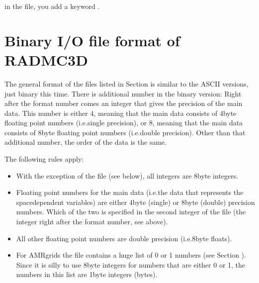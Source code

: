 \documentclass[letterpaper,10pt,english]{sphinxmanual}
\begin{document}
\begin{sphinxVerbatim}[commandchars=\\\{\}]
  
\end{sphinxVerbatim}

in the  file,  you add a keyword .


\section{Binary I/O file format of RADMC\sphinxhyphen{}3D}
\label{\detokenize{binaryio:binary-i-o-file-format-of-radmc-3d}}\label{\detokenize{binaryio:sec-binary-io}}
The general format of the files listed in Section
{\hyperref[\detokenize{binaryio:sec-unformatted-overview}]{}} is similar to the ASCII versions, just binary
this time. There is  additional number in the binary version: Right after
the format number comes an integer that gives the precision of the main
data. This number is either 4, meaning that the main data consists of 4\sphinxhyphen{}byte
floating point numbers (i.e.single precision), or 8, meaning that the main
data consists of 8\sphinxhyphen{}byte floating point numbers (i.e.double precision). Other
than that additional number, the order of the data is the same.

The following rules apply:
\begin{itemize}
\item {} 
With the exception of the  file (see below),
all integers are 8\sphinxhyphen{}byte integers.

\item {} 
Floating point numbers for the main data (i.e.the data that
represents the space\sphinxhyphen{}dependent variables) are either 4\sphinxhyphen{}byte (single) or
8\sphinxhyphen{}byte (double) precision numbers. Which of the two is specified in the
second integer of the file (the integer right after the format number,
see above).

\item {} 
All other floating point numbers are double precision (i.e.8\sphinxhyphen{}byte
floats).

\item {} 
For AMR\sphinxhyphen{}grids the  file contains a huge list
of 0 or 1 numbers (see Section {\hyperref[\detokenize{inputoutputfiles:sec-amr-grid-oct-tree}]{}}). Since it is
silly to use 8\sphinxhyphen{}byte integers for numbers that are either 0 or 1, the
numbers in this list are 1\sphinxhyphen{}byte integers (bytes).

\end{itemize}
\end{document}
